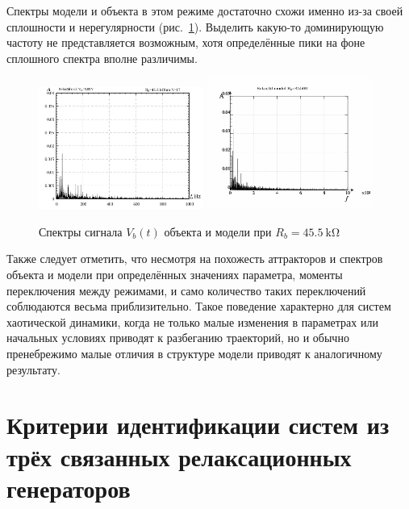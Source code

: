 Спектры модели и объекта в этом режиме достаточно схожи именно из-за
своей сплошности и нерегулярности (рис.~\ref{atu:f:relax3d_mo_f_17}).
Выделить какую-то доминирующую частоту не представляется возможным,
хотя определённые пики на фоне сплошного спектра вполне различимы.

\begin{figure}[htb!]
  \centerline{
    \hfill
    \includegraphics[width=0.48\textwidth]{p/relax3_f_17.png}
    \hfill
    \includegraphics[width=0.48\textwidth]{p/relax3d_read_q-p_fm_17a.png}
    \hfill
  }
  \caption{Спектры сигнала $V_b(t)$ объекта и модели при  $R_b=\SI{45.5}{\kilo\ohm}$}
  \label{atu:f:relax3d_mo_f_17}
\end{figure}

Также следует отметить, что несмотря на похожесть аттракторов и спектров
объекта и модели при определённых значениях параметра,
моменты переключения между режимами, и само количество таких переключений
соблюдаются весьма приблизительно. Такое поведение характерно для систем хаотической динамики,
когда не только малые изменения в параметрах или начальных условиях приводят
к разбеганию траекторий, но и обычно пренебрежимо малые отличия в структуре модели приводят
к аналогичному результату.



\section{Критерии идентификации систем из трёх связанных релаксационных генераторов}


